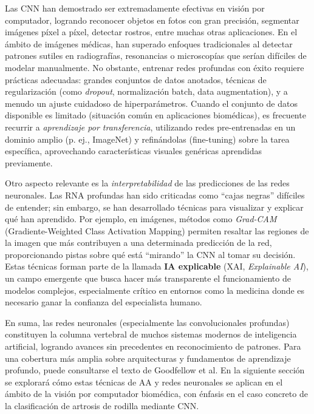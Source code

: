 \documentclass[11pt,spanish,listoffigures,listoftables]{tfgetsinf}
\begin{document}
Las CNN han demostrado ser extremadamente efectivas en visión por computador, logrando reconocer objetos en fotos con gran precisión, segmentar imágenes píxel a píxel, 
detectar rostros, entre muchas otras aplicaciones. En el ámbito de imágenes médicas, han superado enfoques tradicionales al detectar patrones sutiles en radiografías, 
resonancias o microscopías que serían difíciles de modelar manualmente. No obstante, entrenar redes profundas con éxito requiere prácticas adecuadas: grandes conjuntos 
de datos anotados, técnicas de regularización (como \textit{dropout}, normalización batch, data augmentation), y a menudo un ajuste cuidadoso de hiperparámetros. 
Cuando el conjunto de datos disponible es limitado (situación común en aplicaciones biomédicas), es frecuente recurrir a \textit{aprendizaje por transferencia}, 
utilizando redes pre-entrenadas en un dominio amplio (p. ej., ImageNet) y refinándolas (fine-tuning) sobre la tarea específica, aprovechando características visuales 
genéricas aprendidas previamente.

Otro aspecto relevante es la \textit{interpretabilidad} de las predicciones de las redes neuronales. Las RNA profundas han sido criticadas como “cajas negras” 
difíciles de entender; sin embargo, se han desarrollado técnicas para visualizar y explicar qué han aprendido. Por ejemplo, en imágenes, métodos como \textit{Grad-CAM} 
(Gradiente-Weighted Class Activation Mapping) \cite{vanDerVelden2022} permiten resaltar las regiones de la imagen que más contribuyen a una determinada predicción de la red, proporcionando 
pistas sobre qué está “mirando” la CNN al tomar su decisión. Estas técnicas forman parte de la llamada \textbf{IA explicable} (XAI, \textit{Explainable AI}), 
un campo emergente que busca hacer más transparente el funcionamiento de modelos complejos, especialmente crítico en entornos como la medicina donde es necesario ganar 
la confianza del especialista humano.

En suma, las redes neuronales (especialmente las convolucionales profundas) constituyen la columna vertebral de muchos sistemas modernos de inteligencia artificial, 
logrando avances sin precedentes en reconocimiento de patrones. Para una cobertura más amplia sobre arquitecturas y fundamentos de aprendizaje profundo, puede 
consultarse el texto de Goodfellow et al. En la siguiente sección se explorará cómo estas técnicas de AA y redes neuronales se aplican en el ámbito de la visión por 
computador biomédica, con énfasis en el caso concreto de la clasificación de artrosis de rodilla mediante CNN.
\end{document}
